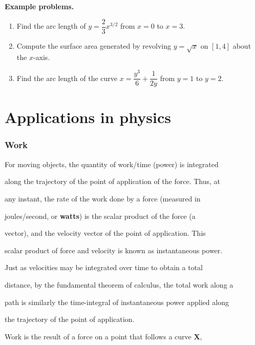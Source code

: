 \textbf{Example problems.}

\begin{enumerate}
    \item Find the arc length of $y = \dfrac{2}{3}x^{3/2}$ from $x=0$ to $x=3$.
    \item Compute the surface area generated by revolving $y = \sqrt{x}$ on $[1, 4]$ about the $x$-axis.
    \item Find the arc length of the curve $x = \dfrac{y^3}{6} + \dfrac{1}{2y}$ from $y=1$ to $y=2$.
\end{enumerate}

\section{Applications in physics}
\label{sec:appl-8ba4}


\subsubsection{Work}
\label{sss:work-67e9}


For moving objects, the quantity of work/time (power) is integrated

along the trajectory of the point of application of the force. Thus, at

any instant, the rate of the work done by a force (measured in

joules/second, or \textbf{watts}) is the scalar product of the force (a

vector), and the velocity vector of the point of application. This

scalar product of force and velocity is known as instantaneous power.

Just as velocities may be integrated over time to obtain a total

distance, by the fundamental theorem of calculus, the total work along a

path is similarly the time-integral of instantaneous power applied along

the trajectory of the point of application.


Work is the result of a force on a point that follows a curve \textbf{X},

